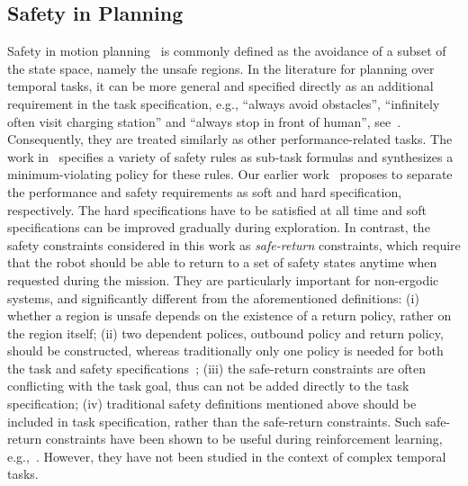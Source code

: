 \subsection{Safety in Planning}\label{subsec:safety}
Safety in motion planning~\cite{lavalle2006planning} is commonly defined as the avoidance of a subset of the state space, namely the {unsafe} regions.
In the literature for planning over temporal tasks,
it can be more general and specified directly as an additional requirement in the task specification,
e.g., ``always avoid obstacles'', ``infinitely often visit charging station'' and ``always stop in front of human'', see~\cite{guo2018probabilistic, hasanbeig2019reinforcement, laurenti2020formal, guo2015multi, schillinger2018simultaneous}.
Consequently, they are treated similarly as other performance-related tasks.
The work in~\cite{tumova2013least, vasile2017minimum} specifies a variety of safety rules as sub-task formulas and synthesizes a minimum-violating policy for these rules.
Our earlier work~\cite{guo2015multi} proposes to separate the performance and safety requirements as soft and hard specification, respectively.
The hard specifications have to be satisfied at all time and soft specifications can be improved gradually during exploration.
In contrast, the safety constraints considered in this work as \emph{safe-return} constraints,
which require that the robot should be able to return to a set of safety states anytime when requested during the mission.
They are particularly important for non-ergodic systems,
and significantly different from the aforementioned definitions:
(i) whether a region is unsafe depends on the existence of a return policy, rather on the region itself;
(ii) two dependent polices, outbound policy and return policy, should be constructed,
whereas traditionally only one policy is needed for both the task and safety specifications~\cite{guo2018probabilistic, laurenti2020formal, guo2015multi, vasile2017minimum};
(iii) the safe-return  constraints are often {conflicting} with the task goal,
thus can not be added directly to the task specification;
(iv) traditional safety definitions mentioned above should be included in task specification,  rather than the safe-return constraints.
{Such safe-return constraints have been shown to be useful during reinforcement learning, e.g.,~\cite{moldovan2012safe,turchetta2016safe}.
However,  they have not been studied in the context of complex temporal tasks.
}

